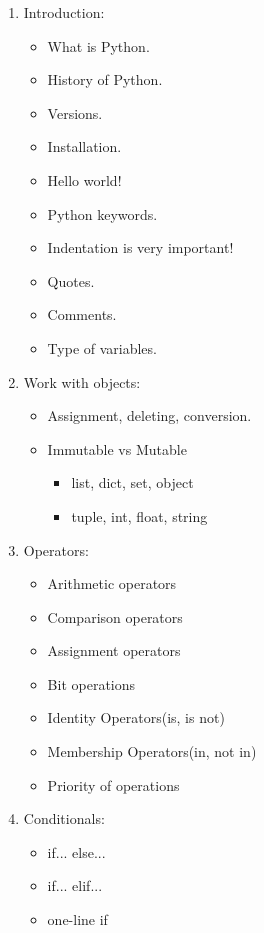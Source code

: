 \documentclass[14pt, a4paper]{article}
\begin{document}
	\begin{enumerate}
		\item Introduction:
		\begin{itemize}			
			\item What is Python.
			\item History of Python.
			\item Versions.
			\item Installation.
			\item Hello world!
			\item Python keywords.
			\item Indentation is very important!
			\item Quotes.
			\item Comments.
			\item Type of variables.
		\end{itemize}
		
		\item Work with objects:
		\begin{itemize}
			\item Assignment, deleting, conversion.
			\item Immutable vs Mutable
			\begin{itemize}
				\item list, dict, set, object
				\item tuple, int, float, string
			\end{itemize}
			
		\end{itemize}
		
		\item Operators:
		\begin{itemize}
			\item Arithmetic operators
			\item Comparison operators
			\item Assignment operators
			\item Bit operations
			\item Identity Operators(is, is not)
			\item Membership Operators(in, not in)
			\item Priority of operations
		\end{itemize}
		
		\item Conditionals:
		\begin{itemize}
			\item if... else...
			\item if... elif...
			\item one-line if
		\end{itemize}
		

\end{enumerate}
\end{document}
